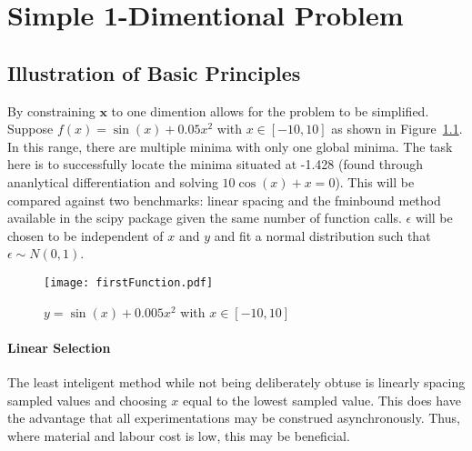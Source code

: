 
\chapter{Simple 1-Dimentional Problem}

\ifpdf
    \graphicspath{{Chapter2/Figs/Raster/}{Chapter2/Figs/PDF/}{Chapter2/Figs/}}
\else
    \graphicspath{{Chapter2/Figs/Vector/}{Chapter2/Figs/}}
\fi


\section[Short title]{Illustration of Basic Principles}

By constraining $\bm{x}$ to one dimention allows for the problem to be simplified. Suppose ${f(x)=\sin(x)+0.05x^2}$ with ${x\in [-10, 10]}$ as shown in Figure~\ref{fig:firstFunction}. In this range, there are multiple minima with only one global minima. The task here is to successfully locate the minima situated at -1.428 (found through ananlytical differentiation and solving ${10\cos(x)+x=0}$). This will be compared against two benchmarks: linear spacing and the fminbound method available in the scipy package given the same number of function calls. $\epsilon$ will be chosen to be independent of $x$ and $y$ and fit a normal distribution such that $\epsilon\sim N(0, 1)$.

\begin{figure}[htbp!] 
\centering    
\texttt{[image: firstFunction.pdf]}
\caption[First Function]{$y = \sin(x) + 0.005x^2$ with $x\in [-10, 10]$}
\label{fig:firstFunction}
\end{figure}



\subsubsection{Linear Selection}
The least inteligent method while not being deliberately obtuse is linearly spacing sampled values and choosing $x$ equal to the lowest sampled value. This does have the advantage that all experimentations may be construed asynchronously. Thus, where material and labour cost is low, this may be beneficial.
